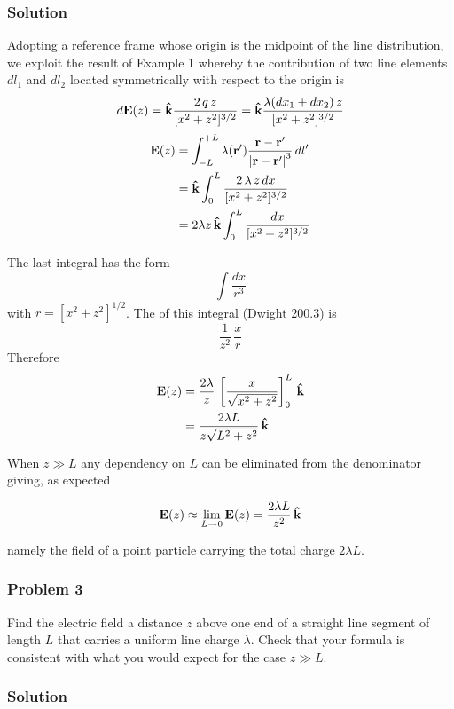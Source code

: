 \subsubsection*{Solution}
Adopting a reference frame whose origin is the midpoint of the line distribution, we exploit the result of Example 1
whereby the contribution of two line elements $dl_1$ and $dl_2$ located symmetrically with respect to the origin is 
$$d \vb{E}(z) = \vu{k} \frac{2\,q\,z}{[x^2 + z^2]^{3/2}} = \vu{k} \frac{\lambda (dx_1 + dx_2) \,z}{[x^2 + z^2]^{3/2}}$$
\begin{align*}
\vb{E}(z) &= \int_{-L}^{+L} \lambda(\vb{r}') \frac{\vb{r} - \vb{r}'}{\abs{\vb{r} - \vb{r}'}^3} \,dl'\\
          &= \vu{k}  \int_{0}^{L} \frac{ 2 \, \lambda \,z \, dx}{[x^2 + z^2]^{3/2}} \\
          &=  2 \lambda z\, \vu{k} \int_{0}^{L} \frac{dx}{[x^2 + z^2]^{3/2}}  
\end{align*}

The last integral has the form 
$$\int \frac{dx}{r^3}$$
with $r = [x^2 + z^2]^{1/2}$. The  of this integral (Dwight 200.3) is $$\frac{1}{z^2}\,\frac{x}{r}$$ Therefore
\begin{align*}
\vb{E}(z) &=  \frac{2 \lambda}{z} \, \left[ \frac{x}{\sqrt{x^2 + z^2}} \right]_0^L  \, \vu{k} \\
          &=  \frac{2 \lambda L }{z\sqrt{L^2 + z^2}} \, \vu{k} 
\end{align*}

When $z \gg L$ any dependency on $L$ can be eliminated from the denominator giving, as expected 

$$\vb{E}(z) \approx \lim_{L \rightarrow 0} \vb{E}(z) = \frac{2 \lambda L }{z^2} \, \vu{k} $$ 

namely the field of a point particle carrying the total charge $2 \lambda L$. 

\subsubsection*{Problem 3}
Find the electric field a distance $z$ above one end of a straight line segment of length $L$ that carries a uniform line charge $\lambda$. Check that your formula is consistent with what you would expect for the case $z \gg L$.

\subsubsection*{Solution}

